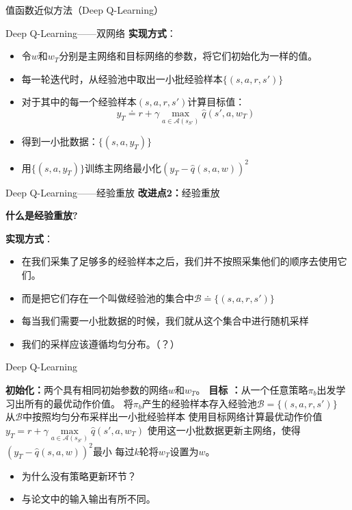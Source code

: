 \begin{section}{值函数近似方法\alert{（Deep Q-Learning）}}
\begin{frame}{Deep Q-Learning——双网络}
    \textbf{实现方式}：
    \begin{itemize}
        \item 令$w$和$w_T$分别是主网络和目标网络的参数，将它们初始化为一样的值。
        \item 每一轮迭代时，从经验池中取出一小批经验样本$\{(s,a,r,s')\}$
        \item 对于其中的每一个经验样本$(s,a,r,s')$计算目标值：
        \[
            y_T\doteq r+\gamma \underset{a\in \mathcal{A}(s_{S'})}{\max}\hat{q}(s',a,w_T)
        \]
        \item 得到一小批数据：$\{(s,a,y_T)\}$
        \item 用$\{(s,a,y_T)\}$训练主网络最小化$(y_T-\hat{q}(s,a,w))^2$
    \end{itemize}
\end{frame}

\begin{frame}{Deep Q-Learning——经验重放}
    \textbf{改进点2：}\alert{经验重放}

    \textbf{什么是经验重放?}

    \textbf{实现方式}：
    \begin{itemize}
        \item 在我们采集了足够多的经验样本之后，我们\alert{并不按照采集他们的顺序去使用它们}。
        \item 而是把它们存在一个叫做\alert{经验池}的集合中\alert{$\mathcal{B}\doteq\{(s,a,r,s')\}$}
        \item 每当我们需要一小批数据的时候，我们就从这个集合中进行随机采样
        \item 我们的采样应该遵循均匀分布。（？）
    \end{itemize}
\end{frame}

\begin{frame}{Deep Q-Learning}
    \begin{algorithmic}[1]
        \State \textbf{初始化：}两个具有相同初始参数的网络$w$和$w_T$。
        \State \textbf{目标 ：}从一个任意策略$\pi_b$出发学习出所有的最优动作价值。
        \State 将$\pi_b$产生的经验样本存入经验池$\mathcal{B}=\{(s,a,r,s')\}$
            \State 从$\mathcal{B}$中按照均匀分布采样出一小批经验样本
                \State 使用目标网络计算最优动作价值$y_T= r+\gamma \underset{a\in \mathcal{A}(s_{S'})}{\max}\hat{q}(s',a,w_T)$
            \EndFor
            \State 使用这一小批数据更新主网络，使得$(y_T-\hat{q}(s,a,w))^2$最小
            \State 每过$k$轮将$w_T$设置为$w$。
        \EndFor
    \end{algorithmic}
    \begin{itemize}
        \item 为什么没有策略更新环节？
        \item 与论文中的输入输出有所不同。
    \end{itemize}
\end{frame}


\end{section}
